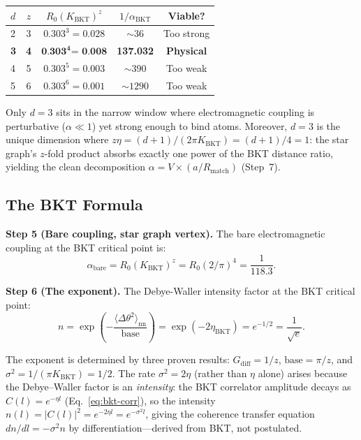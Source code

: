 \documentclass[aps,prd,onecolumn,superscriptaddress,floatfix,12pt]{revtex4-2}
\newcommand{\Rzero}{R_0}
\newcommand{\KBKT}{K_{\text{BKT}}}
\newcommand{\Gdiff}{G_{\text{diff}}}
\newcommand{\alphaBKT}{\alpha_{\text{BKT}}}
\begin{document}
\begin{table}[h]
\begin{tabular}{lcccc}
\toprule
$d$ & $z$ & $\Rzero(\KBKT)^z$ & $1/\alphaBKT$ & Viable? \\
\midrule
2 & 3 & $0.303^3 = 0.028$ & $\sim 36$ & Too strong \\
\textbf{3} & \textbf{4} & $\textbf{0.303}^{\textbf{4}} \textbf{= 0.008}$ & \textbf{137.032} & \textbf{Physical} \\
4 & 5 & $0.303^5 = 0.003$ & $\sim 390$ & Too weak \\
5 & 6 & $0.303^6 = 0.001$ & $\sim 1290$ & Too weak \\
\bottomrule
\end{tabular}
\end{table}

Only $d = 3$ sits in the narrow window where electromagnetic coupling is perturbative ($\alpha \ll 1$) yet strong enough to bind atoms.  Moreover, $d = 3$ is the unique dimension where $z\eta = (d{+}1)/(2\pi\KBKT) = (d{+}1)/4 = 1$: the star graph's $z$-fold product absorbs exactly one power of the BKT distance ratio, yielding the clean decomposition $\alpha = V \times (a/R_{\text{match}})$ (Step~7).

\subsection{The BKT Formula}\label{sec:5-8}

\textbf{Step 5 (Bare coupling, star graph vertex).} The bare electromagnetic coupling at the BKT critical point is:
\begin{equation}
\alpha_{\text{bare}} = \Rzero(\KBKT)^z = \Rzero(2/\pi)^4 = \frac{1}{118.3}.
\end{equation}

\textbf{Step 6 (The exponent).} The Debye-Waller intensity factor at the BKT critical point:
\begin{equation}
n = \exp\!\left(-\frac{\langle\Delta\theta^2\rangle_{\text{nn}}}{\text{base}}\right) = \exp(-2\eta_{\text{BKT}}) = e^{-1/2} = \frac{1}{\sqrt{e}}.
\end{equation}

The exponent is determined by three proven results: $\Gdiff = 1/z$, $\text{base} = \pi/z$, and $\sigma^2 = 1/(\pi \KBKT) = 1/2$.  The rate $\sigma^2 = 2\eta$ (rather than $\eta$ alone) arises because the Debye--Waller factor is an \emph{intensity}: the BKT correlator amplitude decays as $C(l) = e^{-\eta l}$ (Eq.~\ref{eq:bkt-corr}), so the intensity $n(l) = |C(l)|^2 = e^{-2\eta l} = e^{-\sigma^2 l}$, giving the coherence transfer equation $dn/dl = -\sigma^2 n$ by differentiation---derived from BKT, not postulated.
\end{document}
